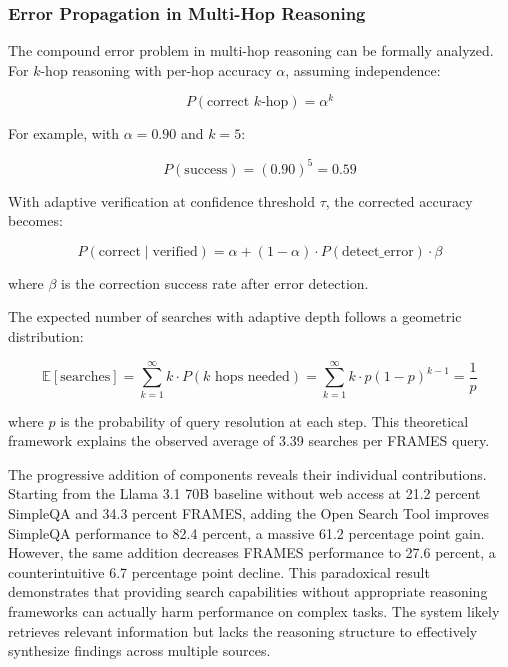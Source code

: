 \subsubsection{Error Propagation in Multi-Hop Reasoning}

The compound error problem in multi-hop reasoning can be formally analyzed. For $k$-hop reasoning with per-hop accuracy $\alpha$, assuming independence:

\begin{equation}
P(\text{correct } k\text{-hop}) = \alpha^k
\label{eq:error_propagation}
\end{equation}

For example, with $\alpha = 0.90$ and $k = 5$:

\begin{equation}
P(\text{success}) = (0.90)^5 = 0.59
\label{eq:five_hop_example}
\end{equation}

With adaptive verification at confidence threshold $\tau$, the corrected accuracy becomes:

\begin{equation}
P(\text{correct} \mid \text{verified}) = \alpha + (1-\alpha) \cdot P(\text{detect\_error}) \cdot \beta
\label{eq:verified_accuracy}
\end{equation}

where $\beta$ is the correction success rate after error detection.

The expected number of searches with adaptive depth follows a geometric distribution:

\begin{equation}
\mathbb{E}[\text{searches}] = \sum_{k=1}^{\infty} k \cdot P(k \text{ hops needed}) = \sum_{k=1}^{\infty} k \cdot p(1-p)^{k-1} = \frac{1}{p}
\label{eq:expected_searches}
\end{equation}

where $p$ is the probability of query resolution at each step. This theoretical framework explains the observed average of 3.39 searches per FRAMES query.

The progressive addition of components reveals their individual contributions. Starting from the Llama 3.1 70B baseline without web access at 21.2 percent SimpleQA and 34.3 percent FRAMES, adding the Open Search Tool improves SimpleQA performance to 82.4 percent, a massive 61.2 percentage point gain. However, the same addition decreases FRAMES performance to 27.6 percent, a counterintuitive 6.7 percentage point decline. This paradoxical result demonstrates that providing search capabilities without appropriate reasoning frameworks can actually harm performance on complex tasks. The system likely retrieves relevant information but lacks the reasoning structure to effectively synthesize findings across multiple sources.

